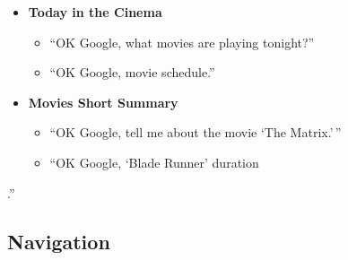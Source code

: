 \documentclass[
  jou,
  floatsintext,
  longtable,
  a4paper,
  nolmodern,
  notxfonts,
  notimes,
  12pt,
  colorlinks=true,linkcolor=blue,citecolor=blue,urlcolor=blue]{apa7}
\providecommand{\tightlist}{%
  \setlength{\itemsep}{0pt}\setlength{\parskip}{0pt}}
\begin{document}
\begin{itemize}
\tightlist
\item
  \textbf{Today in the Cinema}

  \begin{itemize}
  \tightlist
  \item
    ``OK Google, what movies are playing tonight?''
  \item
    ``OK Google, movie schedule.''
  \end{itemize}
\item
  \textbf{Movies Short Summary}

  \begin{itemize}
  \tightlist
  \item
    ``OK Google, tell me about the movie `The Matrix.'\,''
  \item
    ``OK Google, `Blade Runner' duration
  \end{itemize}
\end{itemize}

.''

\subsection{Navigation}\label{navigation}
\end{document}
